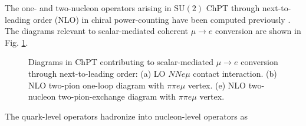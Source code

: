 \documentclass{book}[letterpaper,12pt]
\begin{document}
The one- and two-nucleon operators arising in SU$(2)$ ChPT through next-to-leading order (NLO) in chiral power-counting have been computed previously \cite{Crivellin:2014cta,2018PhRvC..98a5208B,Crivellin:2013ipa,Korber:2017ery}. The diagrams relevant to scalar-mediated coherent $\mu\rightarrow e$ conversion are shown in Fig. \ref{fig:mm_decay_diagrams}. 
\begin{figure}
\hfill
{}
\hfill
{}
\caption{Diagrams in ChPT contributing to scalar-mediated $\mu\rightarrow e$ conversion through next-to-leading order: (a) LO $NNe\mu$ contact interaction. (b) NLO two-pion one-loop diagram with $\pi\pi e\mu$ vertex. (e) NLO two-nucleon two-pion-exchange diagram with $\pi\pi e\mu$ vertex.}
\label{fig:mm_decay_diagrams}
\end{figure}
The quark-level operators hadronize into nucleon-level operators as
\end{document}

